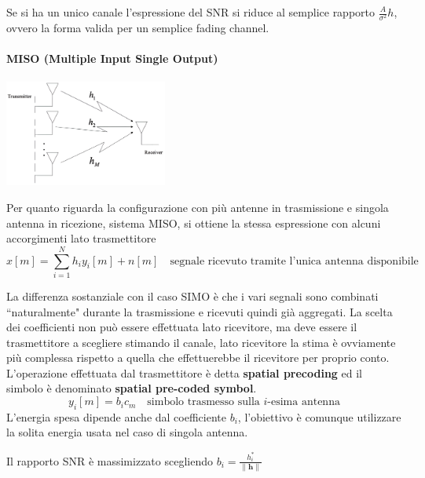Se si ha un unico canale l'espressione del SNR si riduce al semplice rapporto $\frac{A}{\sigma^2}h$, ovvero la forma valida per un semplice fading channel.
\paragraph*{MISO (Multiple Input Single Output)}
\begin{center}
    \includegraphics[width=0.4\textwidth]{imgs/miso.jpg}
\end{center}
Per quanto riguarda la configurazione con più antenne in trasmissione e singola antenna in ricezione, sistema MISO, si ottiene la stessa espressione con alcuni accorgimenti lato trasmettitore
\[
    x[m] = \sum_{i=1}^{N} h_i y_i[m] + n[m] \quad \text{segnale ricevuto tramite l'unica antenna disponibile}
\]


La differenza sostanziale con il caso SIMO è che i vari segnali sono combinati ``naturalmente" durante la trasmissione e ricevuti quindi già aggregati. 
La scelta dei coefficienti non può essere effettuata lato ricevitore, ma deve essere il trasmettitore a scegliere stimando il canale, lato ricevitore la stima è ovviamente più complessa rispetto a quella che effettuerebbe il ricevitore per proprio conto.
L'operazione effettuata dal trasmettitore è detta \textbf{spatial precoding} ed il simbolo è denominato \textbf{spatial pre-coded symbol}.
\[
    y_i[m] = b_i c_m \quad \text{simbolo trasmesso sulla $i$-esima antenna}
\]
L'energia spesa dipende anche dal coefficiente $b_i$, l'obiettivo è comunque utilizzare la solita energia usata nel caso di singola antenna.

Il rapporto SNR è massimizzato scegliendo $b_i = \frac{h_i^*}{ \| \mathbf{h} \| }$

